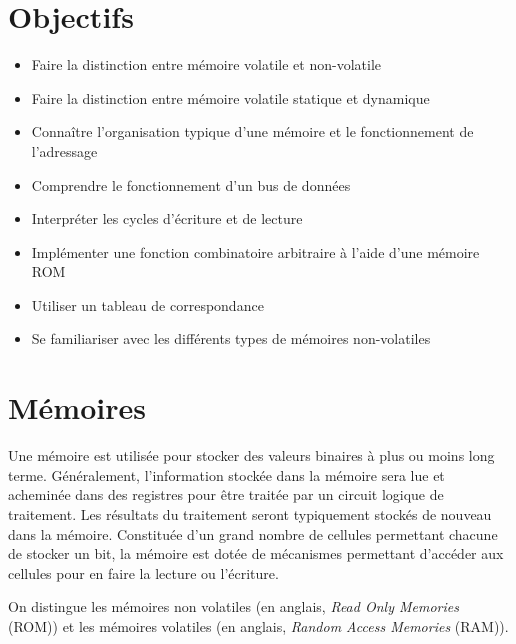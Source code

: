 \documentclass[letter, oneside]{book}
\begin{document}
\section{Objectifs}
\label{sec:org364c238}
\begin{itemize}
\item Faire la distinction entre mémoire volatile et non-volatile
\item Faire la distinction entre mémoire volatile statique et dynamique
\item Connaître l'organisation typique d'une mémoire et le fonctionnement
de l'adressage
\item Comprendre le fonctionnement d'un bus de données
\item Interpréter les cycles d'écriture et de lecture
\item Implémenter une fonction combinatoire arbitraire à l'aide d'une
mémoire ROM
\item Utiliser un tableau de correspondance
\item Se familiariser avec les différents types de mémoires non-volatiles
\end{itemize}

\section{Mémoires}
\label{sec:org351f581}

Une mémoire est utilisée pour stocker des valeurs binaires à plus ou
moins long terme. Généralement, l'information stockée dans la mémoire
sera lue et acheminée dans des registres pour être traitée par un
circuit logique de traitement. Les résultats du traitement seront
typiquement stockés de nouveau dans la mémoire. Constituée d'un grand
nombre de cellules permettant chacune de stocker un bit, la mémoire
est dotée de mécanismes permettant d'accéder aux cellules pour en
faire la lecture ou l'écriture.

On distingue les mémoires non volatiles (en anglais, \emph{Read Only
Memories} (ROM)) et les mémoires volatiles (en anglais, \emph{Random Access
Memories} (RAM)).
\end{document}
